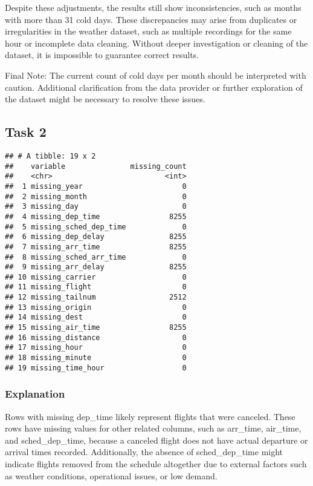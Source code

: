 \documentclass[
]{article}
\begin{document}
Despite these adjustments, the results still show inconsistencies, such
as months with more than 31 cold days. These discrepancies may arise
from duplicates or irregularities in the weather dataset, such as
multiple recordings for the same hour or incomplete data cleaning.
Without deeper investigation or cleaning of the dataset, it is
impossible to guarantee correct results.

Final Note: The current count of cold days per month should be
interpreted with caution. Additional clarification from the data
provider or further exploration of the dataset might be necessary to
resolve these issues.

\subsection{Task 2}\label{task-2}

\begin{verbatim}
## # A tibble: 19 x 2
##    variable               missing_count
##    <chr>                          <int>
##  1 missing_year                       0
##  2 missing_month                      0
##  3 missing_day                        0
##  4 missing_dep_time                8255
##  5 missing_sched_dep_time             0
##  6 missing_dep_delay               8255
##  7 missing_arr_time                8255
##  8 missing_sched_arr_time             0
##  9 missing_arr_delay               8255
## 10 missing_carrier                    0
## 11 missing_flight                     0
## 12 missing_tailnum                 2512
## 13 missing_origin                     0
## 14 missing_dest                       0
## 15 missing_air_time                8255
## 16 missing_distance                   0
## 17 missing_hour                       0
## 18 missing_minute                     0
## 19 missing_time_hour                  0
\end{verbatim}

\subsubsection{Explanation}\label{explanation-1}

Rows with missing dep\_time likely represent flights that were canceled.
These rows have missing values for other related columns, such as
arr\_time, air\_time, and sched\_dep\_time, because a canceled flight
does not have actual departure or arrival times recorded. Additionally,
the absence of sched\_dep\_time might indicate flights removed from the
schedule altogether due to external factors such as weather conditions,
operational issues, or low demand.
\end{document}
